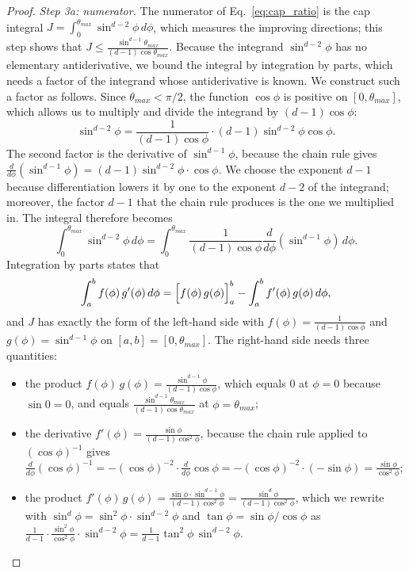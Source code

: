 \documentclass{article}
\theoremstyle{plain}
\theoremstyle{definition}
\theoremstyle{remark}
\begin{document}
\begin{proof}
\emph{Step 3a: numerator.} The numerator of Eq.~\eqref{eq:cap_ratio} is the cap integral $J = \int_0^{\theta_{max}} \sin^{d-2}\phi \, d\phi$, which measures the improving directions; this step shows that $J \le \frac{\sin^{d-1}\theta_{max}}{(d-1)\cos\theta_{max}}$. Because the integrand $\sin^{d-2}\phi$ has no elementary antiderivative, we bound the integral by integration by parts, which needs a factor of the integrand whose antiderivative is known. We construct such a factor as follows. Since $\theta_{max} < \pi/2$, the function $\cos\phi$ is positive on $[0, \theta_{max}]$, which allows us to multiply and divide the integrand by $(d-1)\cos\phi$:
\begin{equation}
    \sin^{d-2}\phi = \frac{1}{(d-1)\cos\phi} \cdot (d-1)\sin^{d-2}\phi \cos\phi.
\end{equation}
The second factor is the derivative of $\sin^{d-1}\phi$, because the chain rule gives $\frac{d}{d\phi}(\sin^{d-1} \phi) = (d-1)\sin^{d-2} \phi \cdot \cos \phi$. We choose the exponent $d-1$ because differentiation lowers it by one to the exponent $d-2$ of the integrand; moreover, the factor $d-1$ that the chain rule produces is the one we multiplied in. The integral therefore becomes
\begin{equation}
    \int_0^{\theta_{max}} \sin^{d-2} \phi \, d\phi = \int_0^{\theta_{max}} \frac{1}{(d-1)\cos \phi} \frac{d}{d\phi}(\sin^{d-1} \phi) \, d\phi.
\end{equation}
Integration by parts states that
\begin{equation}
    \int_a^b f(\phi)\, g'(\phi)\, d\phi = \Bigl[ f(\phi)\, g(\phi) \Bigr]_a^b - \int_a^b f'(\phi)\, g(\phi)\, d\phi,
\end{equation}
and $J$ has exactly the form of the left-hand side with $f(\phi) = \frac{1}{(d-1)\cos\phi}$ and $g(\phi) = \sin^{d-1}\phi$ on $[a, b] = [0, \theta_{max}]$. The right-hand side needs three quantities:
\begin{itemize}
    \item the product $f(\phi)\, g(\phi) = \frac{\sin^{d-1}\phi}{(d-1)\cos\phi}$, which equals $0$ at $\phi = 0$ because $\sin 0 = 0$, and equals $\frac{\sin^{d-1}\theta_{max}}{(d-1)\cos\theta_{max}}$ at $\phi = \theta_{max}$;
    \item the derivative $f'(\phi) = \frac{\sin\phi}{(d-1)\cos^2\phi}$, because the chain rule applied to $(\cos\phi)^{-1}$ gives $\frac{d}{d\phi}(\cos\phi)^{-1} = -(\cos\phi)^{-2} \cdot \frac{d}{d\phi}\cos\phi = -(\cos\phi)^{-2} \cdot (-\sin\phi) = \frac{\sin\phi}{\cos^2\phi}$;
    \item the product $f'(\phi)\, g(\phi) = \frac{\sin\phi \cdot \sin^{d-1}\phi}{(d-1)\cos^2\phi} = \frac{\sin^{d}\phi}{(d-1)\cos^2\phi}$, which we rewrite with $\sin^{d}\phi = \sin^2\phi \cdot \sin^{d-2}\phi$ and $\tan\phi = \sin\phi/\cos\phi$ as $\frac{1}{d-1} \cdot \frac{\sin^2\phi}{\cos^2\phi} \cdot \sin^{d-2}\phi = \frac{1}{d-1} \tan^2\phi \, \sin^{d-2}\phi$.

\end{itemize}
\end{proof}
\end{document}
